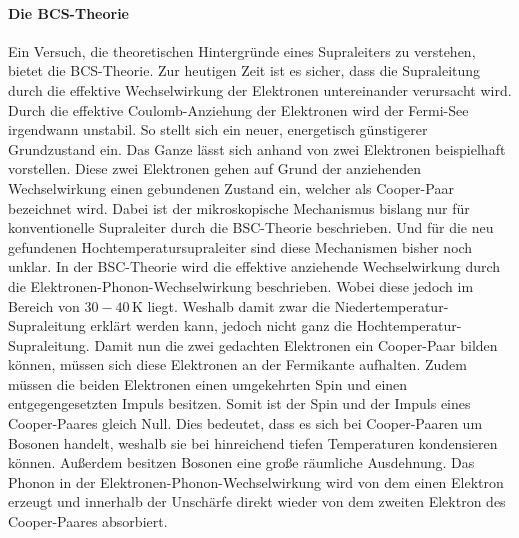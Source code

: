 \paragraph{Die BCS-Theorie}
Ein Versuch, die theoretischen Hintergr\"unde eines Supraleiters zu verstehen, bietet die BCS-Theorie.
Zur heutigen Zeit ist es sicher, dass die Supraleitung durch die effektive Wechselwirkung der Elektronen untereinander verursacht wird.
Durch die effektive Coulomb-Anziehung der Elektronen wird der Fermi-See irgendwann unstabil.
So stellt sich ein neuer, energetisch g\"unstigerer Grundzustand ein.
Das Ganze l\"asst sich anhand von zwei Elektronen beispielhaft vorstellen.
Diese zwei Elektronen gehen auf Grund der anziehenden Wechselwirkung einen gebundenen Zustand ein, welcher als Cooper-Paar bezeichnet wird.
Dabei ist der mikroskopische Mechanismus bislang nur f\"ur konventionelle Supraleiter durch die BSC-Theorie beschrieben.
Und f\"ur die neu gefundenen Hochtemperatursupraleiter sind diese Mechanismen bisher noch unklar.
In der BSC-Theorie wird die effektive anziehende Wechselwirkung durch die Elektronen-Phonon-Wechselwirkung beschrieben.
Wobei diese jedoch im Bereich von $30-40 \, $K liegt.
Weshalb damit zwar die Niedertemperatur-Supraleitung erkl\"art werden kann, jedoch nicht ganz die Hochtemperatur-Supraleitung.
Damit nun die zwei gedachten Elektronen ein Cooper-Paar bilden k\"onnen, m\"ussen sich diese Elektronen an der Fermikante aufhalten.
Zudem m\"ussen die beiden Elektronen einen umgekehrten Spin und einen entgegengesetzten Impuls besitzen.
Somit ist der Spin und der Impuls eines Cooper-Paares gleich Null.
Dies bedeutet, dass es sich bei Cooper-Paaren um Bosonen handelt, weshalb sie bei hinreichend tiefen Temperaturen kondensieren k\"onnen.
Au{\ss}erdem besitzen Bosonen eine gro{\ss}e r\"aumliche Ausdehnung.
Das Phonon in der Elektronen-Phonon-Wechselwirkung wird von dem einen Elektron erzeugt und innerhalb der Unsch\"arfe direkt wieder von dem zweiten Elektron des Cooper-Paares absorbiert.